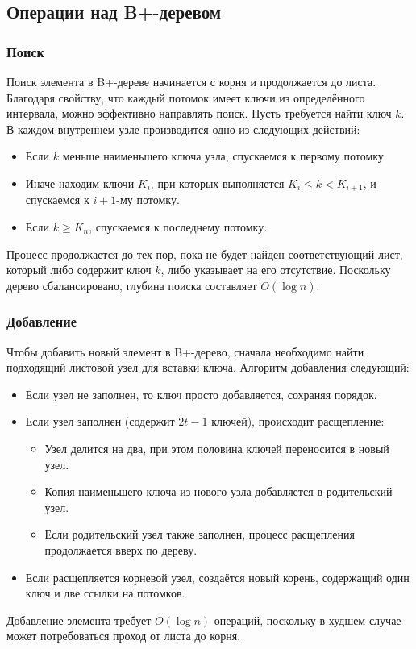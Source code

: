 \documentclass[11pt,a4paper,final]{article} %
\begin{document}
\subsection{Операции над B+-деревом}
\subsubsection{Поиск}
Поиск элемента в B+-дереве начинается с корня и продолжается до листа. Благодаря свойству, что каждый потомок имеет ключи из определённого интервала, можно эффективно направлять поиск. Пусть требуется найти ключ $k$. В каждом внутреннем узле производится одно из следующих действий:
\begin{itemize}
	\item Если $k$ меньше наименьшего ключа узла, спускаемся к первому потомку.
	\item Иначе находим ключи $K_i$, при которых выполняется $K_i \leq k < K_{i+1}$, и спускаемся к $i+1$-му потомку.
	\item Если $k \geq K_n$, спускаемся к последнему потомку.
\end{itemize}
Процесс продолжается до тех пор, пока не будет найден соответствующий лист, который либо содержит ключ $k$, либо указывает на его отсутствие. Поскольку дерево сбалансировано, глубина поиска составляет $O(\log n)$.

\subsubsection{Добавление}
Чтобы добавить новый элемент в B+-дерево, сначала необходимо найти подходящий листовой узел для вставки ключа. Алгоритм добавления следующий:
\begin{itemize}
	\item Если узел не заполнен, то ключ просто добавляется, сохраняя порядок. 
	\item Если узел заполнен (содержит $2t - 1$ ключей), происходит расщепление:
	\begin{itemize}
		\item Узел делится на два, при этом половина ключей переносится в новый узел.
		\item Копия наименьшего ключа из нового узла добавляется в родительский узел.
		\item Если родительский узел также заполнен, процесс расщепления продолжается вверх по дереву.
	\end{itemize}
	\item Если расщепляется корневой узел, создаётся новый корень, содержащий один ключ и две ссылки на потомков.
\end{itemize}
Добавление элемента требует $O(\log n)$ операций, поскольку в худшем случае может потребоваться проход от листа до корня.
\end{document}
